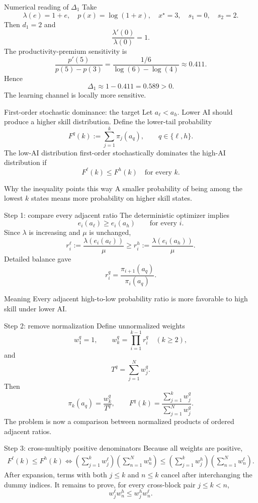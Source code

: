 \documentclass[aspectratio=169,10pt]{beamer}
\begin{document}
\begin{frame}{Numerical reading of \texorpdfstring{$\Delta_1$}{Delta1}}
Take
\[
\lambda(e)=1+e,\quad
p(x)=\log(1+x),\quad
x^\star=3,\quad s_1=0,\quad s_2=2.
\]
Then $d_1=2$ and
\[
\frac{\lambda'(0)}{\lambda(0)}=1.
\]
The productivity-premium sensitivity is
\[
\frac{p'(5)}{p(5)-p(3)}
=
\frac{1/6}{\log(6)-\log(4)}
\approx0.411.
\]
Hence
\[
\Delta_1\approx1-0.411=0.589>0.
\]
The learning channel is locally more sensitive.
\end{frame}

\begin{frame}{First-order stochastic dominance: the target}
Let $a_\ell<a_h$. Lower AI should produce a higher skill distribution.
\vspace{3mm}
Define the lower-tail probability
\[
F^q(k):=\sum_{j=1}^k\pi_j(a_q),
\qquad q\in\{\ell,h\}.
\]
The low-AI distribution first-order stochastically dominates the high-AI distribution if
\[
\boxed{
F^\ell(k)\le F^h(k)
\quad\text{for every }k.}
\]
\begin{block}{Why the inequality points this way}
A smaller probability of being among the lowest $k$ states means more probability on higher skill states.
\end{block}
\end{frame}

\begin{frame}{Step 1: compare every adjacent ratio}
The deterministic optimizer implies
\[
e_i(a_\ell)\ge e_i(a_h)
\qquad\text{for every }i.
\]
Since $\lambda$ is increasing and $\mu$ is unchanged,
\[
r_i^\ell:=
\frac{\lambda(e_i(a_\ell))}{\mu}
\ge
r_i^h:=
\frac{\lambda(e_i(a_h))}{\mu}.
\]
Detailed balance gave
\[
r_i^q=\frac{\pi_{i+1}(a_q)}{\pi_i(a_q)}.
\]
\begin{exampleblock}{Meaning}
Every adjacent high-to-low probability ratio is more favorable to high skill under lower AI.
\end{exampleblock}
\end{frame}

\begin{frame}{Step 2: remove normalization}
Define unnormalized weights
\[
w_1^q=1,
\qquad
w_k^q=\prod_{i=1}^{k-1}r_i^q
\quad(k\ge2),
\]
and
\[
T^q=\sum_{j=1}^Nw_j^q.
\]
Then
\[
\pi_k(a_q)=\frac{w_k^q}{T^q},
\qquad
F^q(k)=
\frac{\sum_{j=1}^k w_j^q}
{\sum_{j=1}^N w_j^q}.
\]
The problem is now a comparison between normalized products of ordered adjacent ratios.
\end{frame}

\begin{frame}{Step 3: cross-multiply positive denominators}
\small
Because all weights are positive,
\begin{align*}
F^\ell(k)\le F^h(k)
\Longleftrightarrow
\left(\sum_{j=1}^k w_j^\ell\right)
\left(\sum_{n=1}^N w_n^h\right)
\le
\left(\sum_{j=1}^k w_j^h\right)
\left(\sum_{n=1}^N w_n^\ell\right).
\end{align*}
After expansion, terms with both $j\le k$ and $n\le k$ cancel after interchanging the dummy indices.
\vspace{3mm}
It remains to prove, for every cross-block pair $j\le k<n$,
\[
\boxed{
w_j^\ell w_n^h
\le
w_j^h w_n^\ell.}
\]
\end{frame}
\end{document}
